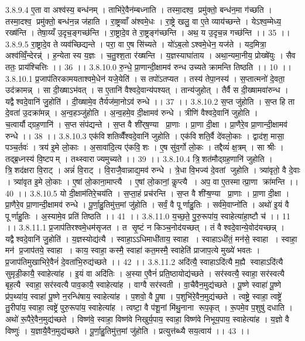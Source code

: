 3.8.9.4
ए॒ता वा अश्व॑स्य॒ बन्ध॑नम् । ताभि॑रे॒वैन॑म्बध्नाति । तस्मा॒दश्व॒ प्रमु॑क्तो॒ बन्ध॑न॒मा ग॑च्छति । तस्मा॒दश्व॒ प्रमु॑क्तो॒ बन्ध॑न॒न्न ज॑हाति । रा॒ष्ट्रव्वाँ अ॑श्वमे॒धः । रा॒ष्ट्रे खलु॒ वा ए॒ते व्याय॑च्छन्ते । येऽश्व॒म्मेध्य॒॒ रख्ष॑न्ति । तेषा॒य्यँ उ॒दृच॒ङ्गच्छ॑न्ति । रा॒ष्ट्रादे॒व ते रा॒ष्ट्रङ्ग॑च्छन्ति । अथ॒ य उ॒दृच॒न्न गच्छ॑न्ति ।। 35 ।।
3.8.9.5
रा॒ष्ट्रादे॒व ते व्यव॑च्छिद्यन्ते । परा॒ वा ए॒ष सि॑च्यते । यो॑ऽब॒लोऽश्वमे॒धेन॒ यज॑ते । यद॒मित्रा॒ अश्व॑व्विँ॒न्देरन्न्॑ । ह॒न्येतास्य य॒ज्ञः । च॒तु॒श्श॒ता र॑ख्षन्ति । य॒ज्ञस्याघा॑ताय । अथा॒न्यमा॒नीय॒ प्रोख्षे॑युः । सैव ततः॒ प्राय॑श्चित्तिः ।। 36 ।।
3.8.10.0
रु॒न्धे॒ प्रा॒णान्दी॒क्षामव॑ रुन्ध उच्यते क्रामन्ति तिष्ठति ।। 10 ।।
3.8.10.1
प्र॒जाप॑तिरकामयताश्वमे॒धेन॑ यजे॒येति॑ । स तपो॑ऽतप्यत । तस्य॑ तेपा॒नस्य॑ । स॒प्तात्मनो॑ दे॒वता॒ उद॑क्रामन्न् । सा दी॒ख्षाऽभ॑वत् । स ए॒तानि॑ वैश्वदे॒वान्य॑पश्यत् । तान्य॑जुहोत् । तैर्वै स दी॒ख्षामवा॑रुन्ध । यद्वैश्वदे॒वानि॑ जु॒होति॑ । दी॒ख्षामे॒व तैर्यज॑मा॒नोऽव॑ रुन्धे ।। 37 ।।
3.8.10.2
स॒प्त जु॑होति । स॒प्त हि ता दे॒वता॑ उ॒दक्रा॑मन्न् । अ॒न्व॒हञ्जु॑होति । अ॒न्व॒हमे॒व दी॒क्षामव॑ रुन्धे । त्रीणि॑ वैश्वदे॒वानि॑ जुहोति । च॒त्वार्यौद्ग्रह॒णानि॑ । स॒प्त संप॑द्यन्ते । स॒प्त वै शी॑र्‌ष॒ण्या प्रा॒णाः । प्रा॒णा दी॒क्षा । प्रा॒णैरे॒व प्रा॒णान्दी॒क्षामव॑ रुन्धे ।। 38 ।।
3.8.10.3
एक॑विशतिव्वैँश्वदे॒वानि॑ जुहोति । एक॑विशति॒र्वै दे॑वलो॒काः । द्वाद॑श॒ मासा॒ पञ्च॒र्तवः॑ । त्रय॑ इ॒मे लो॒काः । अ॒सावा॑दि॒त्य ए॑कवि॒॒शः । ए॒ष सु॑व॒र्गो लो॒कः । तद्दैव्यं॑ क्ष॒त्रम् । सा श्रीः । तद्ब्र॒ध्नस्य॑ वि॒ष्टपम् । तथ्स्वाराज्यमुच्यते ।। 39 ।।
3.8.10.4
त्रि॒॒शत॑मौद्ग्रह॒णानि॑ जुहोति । त्रि॒॒शद॑क्षरा वि॒राट् । अन्नं॑ वि॒राट् । वि॒राजै॒वान्नाद्य॒मव॑ रुन्धे । त्रे॒धा वि॒भज्य॑ दे॒वतां जुहोति । त्र्या॑वृतो॒ वै दे॒वाः । त्र्या॑वृत इ॒मे लो॒काः । ए॒षां लो॒काना॒माप्त्यै । ए॒षां लो॒कानां॒ कॢप्त्यै । अप॒ वा ए॒तस्मात्प्रा॒णा क्रा॑मन्ति ।। 40 ।।
3.8.10.5
यो दी॒क्षाम॑तिरे॒चय॑ति । स॒प्ता॒हं प्रच॑रन्ति । स॒प्त वै शी॑ऱ्ष॒ण्या प्रा॒णाः । प्रा॒णा दी॒क्षा । प्रा॒णैरे॒व प्रा॒णान्दी॒क्षामव॑ रुन्धे । पू॒र्णा॒हु॒तिमु॑त्त॒मां जु॑होति । सर्वं॒ वै पूर्णाहु॒तिः । सर्व॑मे॒वाप्नो॑ति । अथो॑ इ॒यं वै पूर्णाहु॒तिः । अ॒स्यामे॒व प्रति॑ तिष्ठति ।। 41 ।।
3.8.11.0
य॒च्छ॒ते॒ पु॒रु॒रूपा॑य॒ स्वाहेत्या॑हा॒ष्टौ च॑ ।। 11 ।।
3.8.11.1
प्र॒जाप॑तिरश्वमे॒धम॑सृजत । त सृ॒ष्टं न किञ्च॒नोद॑यच्छत् । तं वैश्वदे॒वान्ये॒वोद॑यच्छन्न् । यद्वैश्वदे॒वानि॑ जु॒होति॑ । य॒ज्ञस्योद्य॑त्यै । स्वाहा॒ऽऽधिमाधी॑ताय॒ स्वाहा । स्वाहाऽधी॑तं॒ मन॑से॒ स्वाहा । स्वाहा॒ मन॑ प्र॒जाप॑तये॒ स्वाहा । काय॒ स्वाहा॒ कस्मै॒ स्वाहा॑ कत॒मस्मै॒ स्वाहेति॑ प्राजाप॒त्ये मुख्ये॑ भवतः । प्र॒जाप॑तिमुखाभिरे॒वैनं॑ दे॒वता॑भि॒रुद्य॑च्छते ।। 42 ।।
3.8.11.2
अदि॑त्यै॒ स्वाहाऽदि॑त्यै म॒ह्यै स्वाहाऽदि॑त्यै सुमृडी॒कायै॒ स्वाहेत्या॑ह । इ॒यं वा अदि॑तिः । अ॒स्या ए॒वैनं॑ प्रति॒ष्ठायोद्य॑च्छते । सर॑स्वत्यै॒ स्वाहा॒ सर॑स्वत्यै बृह॒त्यै स्वाहा॒ सर॑स्वत्यै पाव॒कायै॒ स्वाहेत्या॑ह । वाग्वै सर॑स्वती । वा॒चैवैन॒मुद्य॑च्छते । पू॒ष्णे स्वाहा॑ पू॒ष्णे प्र॑प॒थ्या॑य॒ स्वाहा॑ पू॒ष्णे न॒रन्धि॑षाय॒ स्वाहेत्या॑ह । प॒शवो॒ वै पू॒षा । प॒शुभि॑रे॒वैन॒मुद्य॑च्छते । त्वष्ट्रे॒ स्वाहा॒ त्वष्ट्रे॑ तु॒रीपा॑य॒ स्वाहा॒ त्वष्ट्रे॑ पुरु॒रूपा॑य॒ स्वाहेत्या॑ह । त्वष्टा॒ वै प॑शू॒नां मि॑थु॒नाना॑ रूप॒कृत् । रू॒पमे॒व प॒शुषु॑ दधाति । अथो॑ रू॒पैरे॒वैन॒मुद्य॑च्छते । विष्ण॑वे॒ स्वाहा॒ विष्ण॑वे निखुर्य॒पाय॒ स्वाहा॒ विष्ण॑वे निभूय॒पाय॒ स्वाहेत्या॑ह । य॒ज्ञो वै विष्णुः॑ । य॒ज्ञायै॒वैन॒मुद्य॑च्छते । पू॒र्णा॒हु॒तिमु॑त्त॒मां जु॑होति । प्रत्युत्त॑ब्ध्यै सय॒त्वाय॑ ।। 43 ।।
